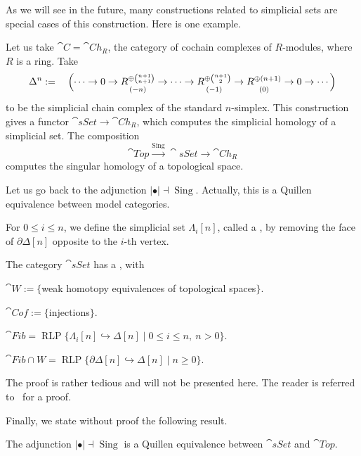 As we will see in the future,
many constructions related to simplicial sets are special cases of this construction.
Here is one example.

\begin{example}
    Let us take $\cat{C}=\cat{Ch}_R$, the category of cochain complexes of $R$-modules,
    where $R$ is a ring. Take
    \[\Delta^n:=\quad\Bigl(\cdots\to0\to
    \underset{(-n)}{R^{\oplus\binom{n+1}{n+1}}}\to
    \cdots\to
    \underset{(-1)}{R^{\oplus\binom{n+1}{2}}}\to
    \underset{(0)}{R^{\oplus(n+1)}}\to0\to\cdots\Bigr)\]
    to be the simplicial chain complex of the standard $n$-simplex.
    This construction gives a functor $\cat{sSet}\to\cat{Ch}_R$,
    which computes the simplicial homology of a simplicial set.
    The composition
    \[\cat{Top}\xrightarrow{\operatorname{Sing}}\cat{sSet}\to\cat{Ch}_R\]
    computes the singular homology of a topological space. \varqed
\end{example}

Let us go back to the adjunction $|{\bullet}|\dashv\operatorname{Sing}$.
Actually, this is a Quillen equivalence between model categories.

For $0\leq i\leq n$, we define the simplicial set $\Lambda_i[n]$, called a ,
by removing the face of $\partial\Delta[n]$ opposite to the $i$-th vertex.

\begin{theorem}
    The category $\cat{sSet}$ has a , with
    \begin{itms}
        \item $\cat W:=\{$weak homotopy equivalences of topological spaces$\}$.
        \item $\cat{Cof}:=\{$injections$\}$.
        \item $\cat{Fib}=\operatorname{RLP}\{\Lambda_i[n]\hookrightarrow\Delta[n]\mid0\leq i\leq n,\ n>0\}$.
        \item $\cat{Fib\cap W}=\operatorname{RLP}\{\partial\Delta[n]\hookrightarrow\Delta[n]\mid n\geq0\}$.
    \end{itms}
\end{theorem}

The proof is rather tedious and will not be presented here.
The reader is referred to~\cite[Theorem~3.6.5]{hovey} for a proof.

Finally, we state without proof the following result.

\begin{theorem}
    The adjunction $|{\bullet}|\dashv\operatorname{Sing}$
    is a Quillen equivalence between $\cat{sSet}$ and $\cat{Top}$.
\end{theorem}

